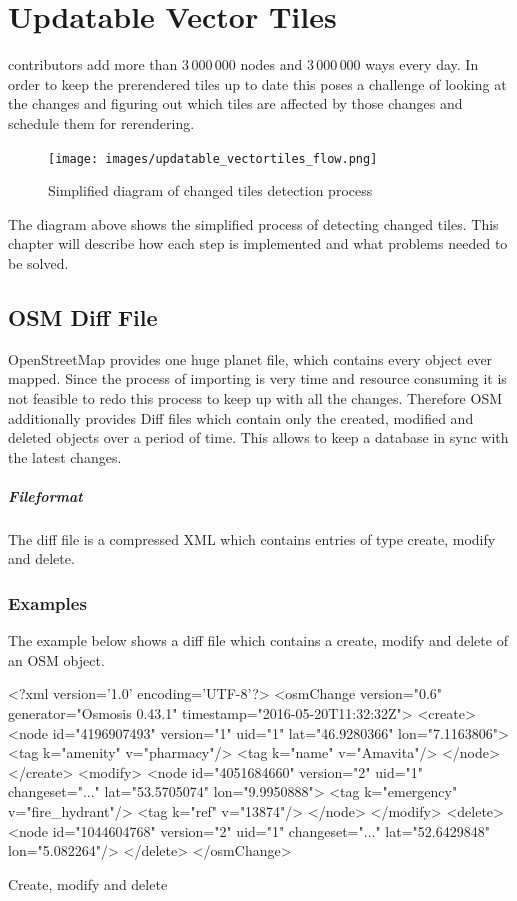 \chapter{Updatable Vector Tiles}

\osm{} contributors add more than $3\,000\,000$ nodes and $3\,000\,000$ ways every day.
In order to keep the prerendered tiles up to date this poses a challenge of looking at the changes
and figuring out which tiles are affected by those changes and schedule them for rerendering.

\begin{figure}[H]
  \centering
  \texttt{[image: images/updatable\_vectortiles\_flow.png]}
  \caption{Simplified diagram of changed tiles detection process}
\end{figure}

The diagram above shows the simplified process of detecting changed tiles. This chapter will describe how each step is implemented and what problems needed to be solved.

\section{OSM Diff File}

OpenStreetMap provides one huge planet file, which contains every object ever mapped. Since the process of importing is very time and resource consuming it is not feasible to redo this process to keep up with all the changes. Therefore OSM additionally provides Diff files which contain only the created, modified and deleted objects over a period of time. This allows to keep a database in sync with the latest changes. 

\paragraph{Fileformat} The diff file is a compressed XML which contains entries of type create, modify and delete. 

\subsection{Examples}
The example below shows a diff file which contains a create, modify and delete of an OSM object.
\begin{listing}[H]
  \centering
  \begin{xmlcode}
<?xml version='1.0' encoding='UTF-8'?>
<osmChange version="0.6" generator="Osmosis 0.43.1" timestamp="2016-05-20T11:32:32Z">
  <create>
    <node id="4196907493" version="1" uid="1" lat="46.9280366" lon="7.1163806">
      <tag k="amenity" v="pharmacy"/>
      <tag k="name" v="Amavita"/>
    </node>
  </create>
  <modify>
    <node id="4051684660" version="2" uid="1" changeset="..." lat="53.5705074" lon="9.9950888">
      <tag k="emergency" v="fire_hydrant"/>
      <tag k="ref" v="13874"/>
    </node>
    </modify>
  <delete>
    <node id="1044604768" version="2" uid="1" changeset="..." lat="52.6429848" lon="5.082264"/>
  </delete>
</osmChange>
  \end{xmlcode}
  \caption{Create, modify and delete}
\end{listing}

